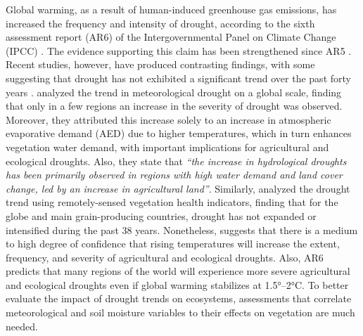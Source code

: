 \documentclass[
  authoryear,
  preprint,
  3p,
  onecolumn]{elsarticle}
\begin{document}
Global warming, as a result of human-induced greenhouse gas emissions,
has increased the frequency and intensity of drought, according to the
sixth assessment report (AR6) of the Intergovernmental Panel on Climate
Change (IPCC) \citep{IPCC2023}. The evidence supporting this claim has
been strengthened since AR5 \citep{IPCC2013}. Recent studies, however,
have produced contrasting findings, with some suggesting that drought
has not exhibited a significant trend over the past forty years
\citep{Vicente-Serrano2022, Kogan2020}. \citet{Vicente-Serrano2022}
analyzed the trend in meteorological drought on a global scale, finding
that only in a few regions an increase in the severity of drought was
observed. Moreover, they attributed this increase solely to an increase
in atmospheric evaporative demand (AED) due to higher temperatures,
which in turn enhances vegetation water demand, with important
implications for agricultural and ecological droughts. Also, they state
that \emph{``the increase in hydrological droughts has been primarily
observed in regions with high water demand and land cover change, led by
an increase in agricultural land''}. Similarly, \citet{Kogan2020}
analyzed the drought trend using remotely-sensed vegetation health
indicators, finding that for the globe and main grain-producing
countries, drought has not expanded or intensified during the past 38
years. Nonetheless, \citet{IPCC2021} suggests that there is a medium to
high degree of confidence that rising temperatures will increase the
extent, frequency, and severity of agricultural and ecological droughts.
Also, AR6 \citep{IPCC2023} predicts that many regions of the world will
experience more severe agricultural and ecological droughts even if
global warming stabilizes at 1.5°--2°C. To better evaluate the impact of
drought trends on ecosystems, assessments that correlate meteorological
and soil moisture variables to their effects on vegetation are much
needed.
\end{document}
